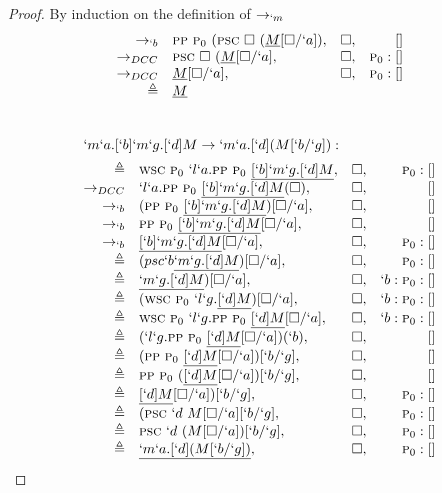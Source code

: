 \begin{proof}{By induction on the definition of $\rightarrow_{`m}$}
\[\begin{array}{rlrr}
   \to_{`b}     & \textsc{pp}\ \textsc{p$_0$}\ (\textsc{psc}\ \square\ (\underline{M}[\square/`a]), & \square, & [] \\
   \to_{DCC}   & \textsc{psc}\ \square\ (\underline{M}[\square/`a], & \square, & \textsc{p$_0$}:[] \\
   \to_{DCC}   & \underline{M}[\square/`a], & \square,  & \textsc{p$_0$}:[] \\
   \triangleq & \underline{M} \\
\end{array}
\]
\\ 
\[
\begin{array}{rlrr}
  \prooflabel{`m`a.[`b]`m`g.[`d]M \to `m`a.[`d](M[`b/`g]):} \\
    \triangleq & \wsc\ \gp\ `l`a.\pp\ \gp\ \tr{[`b]`m`g.[`d]M}, & \square, & \gp:[] \\
    \todcc\    & `l`a.\pp\ \gp\ \tr{[`b]`m`g.[`d]M}(\square), & \square, & [] \\
    \tob\      & (\pp\ \gp\ \tr{[`b]`m`g.[`d]M})[\square/`a], & \square,& [] \\
    \tob\      & \pp\ \gp\ \tr{[`b]`m`g.[`d]M}[\square/`a], & \square,& [] \\
    \tob\      & \tr{[`b]`m`g.[`d]M}[\square/`a], & \square,& \gp:[] \\
    \triangleq & (psc `b \tr{`m`g.[`d]M})[\square/`a], & \square,& \gp:[] \\
    \triangleq & \tr{`m`g.[`d]M})[\square/`a], & \square, & `b:\gp:[] \\
    \triangleq & (\wsc\ \gp\ `l`g.\tr{[`d]M})[\square/`a], & \square,& `b:\gp:[] \\
    \triangleq & \wsc\ \gp\ `l`g.\pp\ \gp\ \tr{[`d]M}[\square/`a], & \square, & `b:\gp:[] \\
    \triangleq & (`l`g.\pp\ \gp\ \tr{[`d]M}[\square/`a])(`b), & \square, & [] \\
    \triangleq & (\pp\ \gp\ \tr{[`d]M}[\square/`a])[`b/`g], & \square,& [] \\
    \triangleq & \pp\ \gp\ (\tr{[`d]M}[\square/`a])[`b/`g], & \square,& [] \\
    \triangleq & \tr{[`d]M}[\square/`a])[`b/`g], & \square,& \gp:[] \\
    \triangleq & (\psc\ `d\ M[\square/`a][`b/`g], & \square,& \gp:[] \\
    \triangleq & \psc\ `d\ (M[\square/`a])[`b/`g], & \square,& \gp:[] \\
    \triangleq & \tr{`m`a.[`d](M[`b/`g])}, & \square,& \gp:[] \\
\end{array}
\]
\end{proof}
